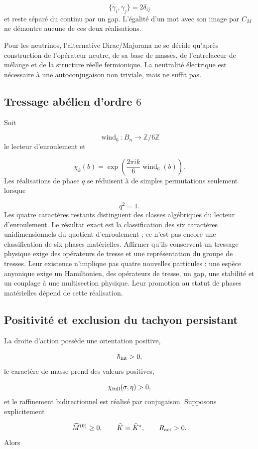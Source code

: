 \[
\{\gamma_i,\gamma_j\}=2\delta_{ij}
\]
et reste séparé du continu par un gap. L'égalité d'un mot avec son image par \(C_M\) ne démontre aucune de ces deux réalisations.

Pour les neutrinos, l'alternative Dirac/Majorana ne se décide qu'après construction de l'opérateur neutre, de sa base de masses, de l'entrelaceur de mélange et de la structure réelle fermionique. La neutralité électrique est nécessaire à une autoconjugaison non triviale, mais ne suffit pas.

\subsection{Tressage abélien d'ordre \(6\)}
Soit

\[
\operatorname{wind}_6:B_n\longrightarrow\mathbb Z/6\mathbb Z
\]
le lecteur d'enroulement et

\[
\chi_k(b)=\exp\!\left(
\frac{2\pi i k}{6}\operatorname{wind}_6(b)\right).
\]
Les réalisations de phase \(q\) se réduisent à de simples permutations seulement lorsque

\[
q^2=1.
\]
Les quatre caractères restants distinguent des classes algébriques du lecteur d'enroulement. Le résultat exact est la classification des six caractères unidimensionnels du quotient d'enroulement ; ce n'est pas encore une classification de six phases matérielles. Affirmer qu'ils conservent un tressage physique exige des opérateurs de tresse et une représentation du groupe de tresses. Leur existence n'implique pas quatre nouvelles particules : une espèce anyonique exige un Hamiltonien, des opérateurs de tresse, un gap, une stabilité et un couplage à une multisection physique. Leur promotion au statut de phases matérielles dépend de cette réalisation.

\subsection{Positivité et exclusion du tachyon persistant}
La droite d'action possède une orientation positive,

\[
\hbar_{\rm int}>0,
\]
le caractère de masse prend des valeurs positives,

\[
\chi_{\rm full}(\sigma,\eta)>0,
\]
et le raffinement bidirectionnel est réalisé par conjugaison. Supposons explicitement

\[
\widehat M^{(0)}\ge0,
\qquad
\widehat K=\widehat K^*,
\qquad
R_{\rm act}>0.
\]
Alors

